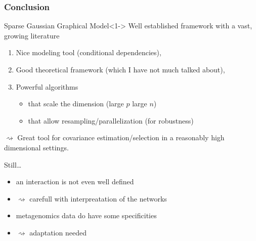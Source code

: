 \begin{frame}
  \frametitle{Conclusion}
  
  \begin{block}{Sparse Gaussian Graphical Model}<1->
    \alert{Well established} framework with a vast, growing literature
    \begin{enumerate}
    \item Nice modeling tool (conditional dependencies),
    \item Good theoretical framework (which I have not much talked about),
    \item Powerful algorithms
      \begin{itemize}
      \item that scale the dimension (large $p$ large $n$)
      \item that allow resampling/parallelization (for robustness)
      \end{itemize}
    \end{enumerate}
    $\rightsquigarrow$       Great      tool       for      covariance
    \alert{estimation}/\alert{selection} in  a \alert{reasonably} high
    dimensional settings.
  \end{block}
  
  \vfill

  \begin{beamerboxesrounded}[upper=sur:head,lower=sur:bloc,shadow=true]{Still\dots}
    \begin{itemize}
    \item an \alert{interaction} is not even well defined
    \item $\rightsquigarrow$ carefull with interpreatation of the networks 
    \item metagenomics data do have some specificities
    \item $\rightsquigarrow$ adaptation needed
    \end{itemize}
  \end{beamerboxesrounded}
      
\end{frame}
